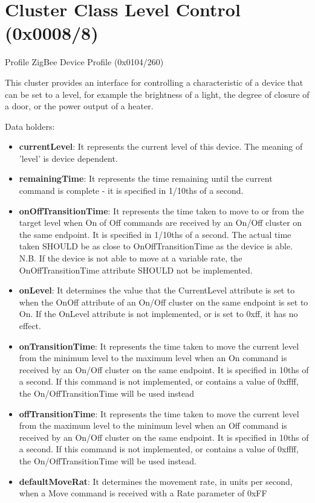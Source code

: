 \section{Cluster Class Level Control (0x0008/8)}

Profile ZigBee Device Profile (0x0104/260)

This cluster provides an interface for controlling a characteristic of a device that can be set to a level, for example the brightness of a light, the degree of closure of a door, or the power output of a heater.
\newline

\noindent
Data holders:

\begin{itemize}
\item \textbf{currentLevel}: It represents the current level of this device. The meaning of 'level' is device dependent.
\item \textbf{remainingTime}: It represents the time remaining until the current command is complete - it is specified in 1/10ths of a second.
\item \textbf{onOffTransitionTime}: It represents the time taken to move to or from the target level when On of Off commands are received by an On/Off cluster on the same endpoint. It is specified in 1/10ths of a second. The actual time taken SHOULD be as close to OnOffTransitionTime as the device is able. N.B. If the device is not able to move at a variable rate, the OnOffTransitionTime attribute SHOULD not be implemented.
\item \textbf{onLevel}: It determines the value that the CurrentLevel attribute is set to when the OnOff attribute of an On/Off cluster on the same endpoint is set to On. If the OnLevel attribute is not implemented, or is set to 0xff, it has no effect.
\item \textbf{onTransitionTime}: It represents the time taken to move the current level from the minimum level to the maximum level when an On command is received by an On/Off cluster on the same endpoint. It is specified in 10ths of a second. If this command is not implemented, or contains a value of 0xffff, the On/OffTransitionTime will be used instead
\item \textbf{offTransitionTime}: It represents the time taken to move the current level from the maximum level to the minimum level when an Off command is received by an On/Off cluster on the same endpoint. It is specified in 10ths of a second. If this command is not implemented, or contains a value of 0xffff, the On/OffTransitionTime will be used instead.
\item \textbf{defaultMoveRat}: It determines the movement rate, in units per second, when a Move command is received with a Rate parameter of 0xFF
\end{itemize}

